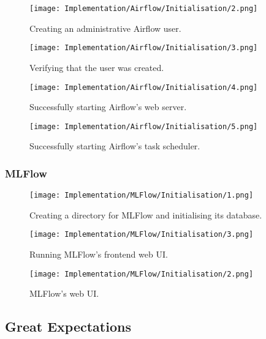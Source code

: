 \begin{figure}[H]
    \centering
    \texttt{[image: Implementation/Airflow/Initialisation/2.png]}
    \caption{Creating an administrative Airflow user.}
    \label{fig:AirflowUser1}
\end{figure}

\begin{figure}[H]
    \centering
    \texttt{[image: Implementation/Airflow/Initialisation/3.png]}
    \caption{Verifying that the user was created.}
    \label{fig:AirflowUser2}
\end{figure}

\begin{figure}[H]
    \centering
    \texttt{[image: Implementation/Airflow/Initialisation/4.png]}
    \caption{Successfully starting Airflow's web server.}
    \label{fig:AirflowWebserver}
\end{figure}

\begin{figure}[H]
    \centering
    \texttt{[image: Implementation/Airflow/Initialisation/5.png]}
    \caption{Successfully starting Airflow's task scheduler.}
    \label{fig:AirflowScheduler}
\end{figure}

\subsubsection{MLFlow}

\begin{figure}[H]
    \centering
    \texttt{[image: Implementation/MLFlow/Initialisation/1.png]}
    \caption{Creating a directory for MLFlow and initialising its database.}
    \label{fig:MLFlowInit}
\end{figure}

\begin{figure}[H]
    \centering
    \texttt{[image: Implementation/MLFlow/Initialisation/3.png]}
    \caption{Running MLFlow's frontend web UI.}
    \label{fig:MLFlowUICmd}
\end{figure}

\begin{figure}[H]
    \centering
    \texttt{[image: Implementation/MLFlow/Initialisation/2.png]}
    \caption{MLFlow's web UI.}
    \label{fig:MLFlowEmptyUI}
\end{figure}

\subsection{Great Expectations}

